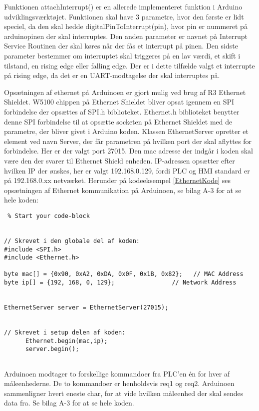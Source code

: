 Funktionen attachInterrupt() er en allerede implementeret funktion i Arduino udviklingsværktøjet. Funktionen skal have 3 parametre, hvor den første er lidt speciel, da den skal hedde digitalPinToInterrupt(pin), hvor pin er nummeret på arduinopinen der skal interruptes. Den anden parameter er navnet på Interrupt Service Routinen der skal køres når der fås et interrupt på pinen. Den sidste parameter bestemmer om interruptet skal triggeres på en lav værdi, et skift i tilstand, en rising edge eller falling edge. Der er i dette tilfælde valgt et interrupte på rising edge, da det er en UART-modtagelse der skal interruptes på. 

Opsætningen af ethernet på Arduinoen er gjort mulig ved brug af R3 Ethernet Shieldet. W5100 chippen på Ethernet Shieldet bliver opsat igennem en SPI forbindelse der opsættes af SPI.h biblioteket. Ethernet.h biblioteket benytter denne SPI forbindelse til at opsætte socketen på Ethernet Shieldet med de parametre, der bliver givet i Arduino koden. Klassen EthernetServer opretter et element ved navn Server, der får parametren på hvilken port der skal aflyttes for forbindelse. Her er der valgt port 27015. Den mac adresse der indgår i koden skal være den der svarer til Ethernet Shield enheden. IP-adressen opsætter efter hvilken IP der ønskes, her er valgt 192.168.0.129, fordi PLC og HMI standard er på 192.168.0.xx netværket. Herunder på kodeeksempel \ref{EthernetKode} ses opsætningen af Ethernet kommunikation på Arduinoen, se bilag A-3 for at se hele koden:


\begin{lstlisting} % Start your code-block


// Skrevet i den globale del af koden:
#include <SPI.h>
#include <Ethernet.h>

byte mac[] = {0x90, 0xA2, 0xDA, 0x0F, 0x1B, 0x82};   // MAC Address
byte ip[] = {192, 168, 0, 129};                // Network Address


EthernetServer server = EthernetServer(27015);


// Skrevet i setup delen af koden:
      Ethernet.begin(mac,ip);
      server.begin();


\end{lstlisting}

Arduinoen modtager to forskellige kommandoer fra PLC'en én for hver af måleenhederne. De to kommandoer er henholdsvis req1 og req2. Arduinoen sammenligner hvert eneste char, for at vide hvilken måleenhed der skal sendes data fra. Se bilag A-3 for at se hele koden. 

